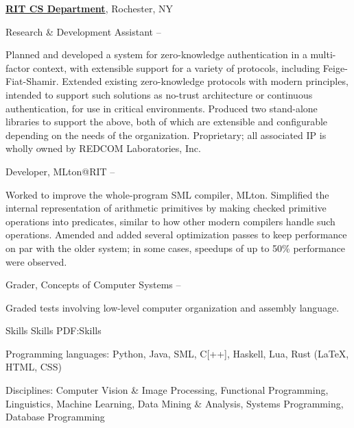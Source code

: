 \documentclass[letterpaper,MMMyyyy,nonstopmode]{simpleresumecv}
\begin{document}
\begin{Body}
\Entry
\href{http://cs.rit.edu}
{\textbf{RIT CS Department}},
Rochester, NY

\Gap
\BulletItem
Research \& Development Assistant
\hfill
{} --
\begin{Detail}
\SubBulletItem
Planned and developed a system for zero-knowledge authentication in a multi-
factor context, with extensible support for a variety of protocols, including
Feige-Fiat-Shamir.
\SubBulletItem
Extended existing zero-knowledge protocols with modern principles, intended to
support such solutions as no-trust architecture or continuous authentication,
for use in critical environments.
\SubBulletItem
Produced two stand-alone libraries to support the above, both of which are
extensible and configurable depending on the needs of the organization.
Proprietary; all associated IP is wholly owned by REDCOM Laboratories, Inc.
\end{Detail}

\Gap
\BulletItem
Developer,
MLton@RIT
\hfill
{} --
\begin{Detail}
\SubBulletItem
Worked to improve the whole-program SML compiler, MLton.
\SubBulletItem
Simplified the internal representation of arithmetic primitives by making
checked primitive operations into predicates, similar to how other modern
compilers handle such operations.
\SubBulletItem
Amended and added several optimization passes to keep performance on par with
the older system; in some cases, speedups of up to 50\% performance were
observed.
\end{Detail}

\Gap
\BulletItem
Grader,
Concepts of Computer Systems
\hfill
{} --
\begin{Detail}
\SubBulletItem
Graded tests involving low-level computer organization and assembly language.
\end{Detail}


\Section
{Skills}
{Skills}
{PDF:Skills}

\BulletItem
Programming languages:
Python,
Java,
SML,
C[++],
Haskell,
Lua,
Rust
(\LaTeX, HTML, CSS)

\BulletItem
Disciplines:
Computer Vision \& Image Processing,
Functional Programming, %
Linguistics,
Machine Learning,
Data Mining \& Analysis,
Systems Programming,
Database Programming


\end{Body}
\end{document}
